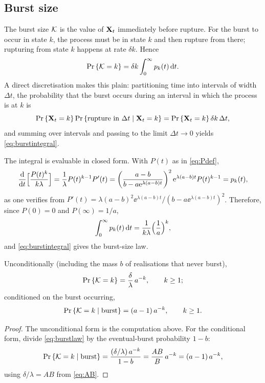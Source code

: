 \subsection{Burst size}
\label{sec:burst-size}

The burst size $\mathcal{K}$ is the value of ${{\bf X}_t}$ immediately before rupture. For
the burst to occur in state $k$, the process must be in state $k$ and then
rupture from there; rupturing from state $k$ happens at rate $\delta k$.
Hence
\begin{equation}
{\text{Pr}\left\{\mathcal{K}= k\right\}} = \delta k \int_0^\infty p_k(t)\,{\rm d} t.
\label{eq:burstintegral}
\end{equation}
A direct discretisation makes this plain: partitioning time into intervals
of width $\Delta t$, the probability that the burst occurs during an interval
in which the process is at $k$ is
$$
{\text{Pr}\left\{{{\bf X}_t}=k\right\}}\,{\text{Pr}\left\{\text{rupture in }\Delta t\mid{{\bf X}_t}=k\right\}}
={\text{Pr}\left\{{{\bf X}_t}=k\right\}}\,\delta k\,\Delta t,
$$
and summing over intervals and passing to the limit $\Delta t\to0$ yields
\eqref{eq:burstintegral}.

The integral is evaluable in closed form. With $P(t)$ as in \eqref{eq:Pdef},
\begin{equation}
\frac{{\rm d}}{{\rm d} t}\Bigl[\frac{P(t)^k}{k\lambda}\Bigr]
=\frac{1}{\lambda}P(t)^{k-1}P'(t)
=\left(\frac{a-b}{b-a{\rm e}^{\lambda(a-b)t}}\right)^2
{\rm e}^{\lambda(a-b)t}P(t)^{k-1}
=p_k(t),
\label{eq:antideriv}
\end{equation}
as one verifies from
$P'(t)=\lambda(a-b)^2\ee^{\lambda(a-b)t}/(b-a\ee^{\lambda(a-b)t})^2$.
Therefore, since $P(0)=0$ and $P(\infty)=1/a$,
\begin{equation}
\int_0^\infty p_k(t)\,{\rm d} t=\frac{1}{k\lambda}\Bigl(\frac{1}{a}\Bigr)^k,
\end{equation}
and \eqref{eq:burstintegral} gives the burst-size law.

\begin{theorem}
\label{thm:burst}
Unconditionally (including the mass $b$ of realisations that never burst),
\begin{equation}
{\text{Pr}\left\{\mathcal{K}=k\right\}}=\frac{\delta}{\lambda}\,a^{-k},\qquad k\ge1;
\label{eq:burstlaw}
\end{equation}
conditioned on the burst occurring,
\begin{equation}
{\text{Pr}\left\{\mathcal{K}=k\mid\text{burst}\right\}}=(a-1)\,a^{-k},\qquad k\ge1.
\label{eq:burstlaw-cond}
\end{equation}
\end{theorem}

\begin{proof}
The unconditional form is the computation above. For the conditional form,
divide \eqref{eq:burstlaw} by the eventual-burst probability $1-b$:
$$
{\text{Pr}\left\{\mathcal{K}=k\mid\text{burst}\right\}}
=\frac{(\delta/\lambda)\,a^{-k}}{1-b}
=\frac{AB}{B}\,a^{-k}
=(a-1)\,a^{-k},
$$
using $\delta/\lambda=AB$ from \eqref{eq:AB}.
\end{proof}

